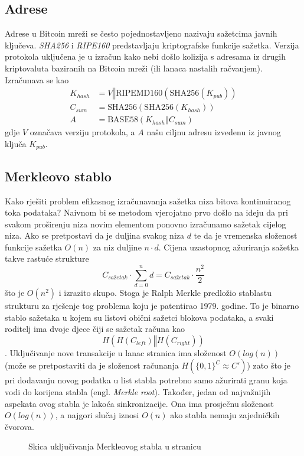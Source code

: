 \documentclass[utf8, zavrsni]{fer}
\begin{document}
\subsection{Adrese}
Adrese u Bitcoin mreži se često pojednostavljeno nazivaju sažetcima javnih ključeva. \textit{SHA256} i \textit{RIPE160} predstavljaju kriptografske funkcije sažetka. Verzija protokola uključena je u izračun kako nebi došlo kolizija s adresama iz drugih kriptovaluta baziranih na Bitcoin mreži (ili lanaca nastalih račvanjem). Izračunava se kao
\begin{equation} \label{eq2}
\begin{split}
K_{hash} &= V \mathbin\Vert \mathrm{RIPEMD160}(\mathrm{SHA256}(K_{pub})) \\
C_{sum}  &= \mathrm{SHA256}(\mathrm{SHA256}(K_{hash})) \\
A        &= \mathrm{BASE58}(K_{hash} \mathbin\Vert C_{sum})
\end{split}
\end{equation}
gdje $ V $ označava verziju protokola, a $A$ našu ciljnu adresu izvedenu iz javnog ključa $K_{pub}$.

\subsection{Merkleovo stablo}
\label{merkle}
Kako rješiti problem efikasnog izračunavanja sažetka niza bitova kontinuiranog toka podataka? Naivnom bi se metodom vjerojatno prvo došlo na ideju da pri svakom proširenju niza novim elementom ponovno izračunamo sažetak cijelog niza. Ako se pretpostavi da je duljina svakog niza $d$ te da je vremenska složenost funkcije sažetka $O(n)$ za niz duljine $n \cdot d$. Cijena uzastopnog ažuriranja sažetka takve rastuće strukture
$$
C_{sažetak} \cdot \sum_{d=0}^{n} d = C_{sažetak} \cdot \frac{n^2}{2}
$$
što je $O(n^2)$ i izrazito skupo. Stoga je Ralph Merkle predložio stablastu strukturu za rješenje tog problema koju je patentirao 1979. godine. To je binarno stablo sažetaka u kojem su listovi obični sažetci blokova podataka, a svaki roditelj ima dvoje djece čiji se sažetak računa kao $$ H(H(C_{left}) \mathbin\Vert H(C_{right})) $$.
Uključivanje nove transakcije u lanac stranica ima složenost $O(log(n))$ (može se pretpostaviti da je složenost računanja $H(\{0,1\}^C \approx C')$) zato što je pri dodavanju novog podatka u list stabla potrebno samo ažurirati granu koja vodi do korijena stabla (engl. \textit{Merkle root}). Također, jedan od najvažnijih aspekata ovog stabla je lakoća sinkronizacije. Ona ima prosječnu složenost $O(log(n))$, a najgori slučaj iznosi $O(n)$ ako stabla nemaju zajedničkih čvorova.
\begin{figure}[H]
    \label{chainscheme}
    \resizebox{\textwidth}{!}{%
    
    }%
    \caption{Skica uključivanja Merkleovog stabla u stranicu}
\end{figure}
\end{document}
